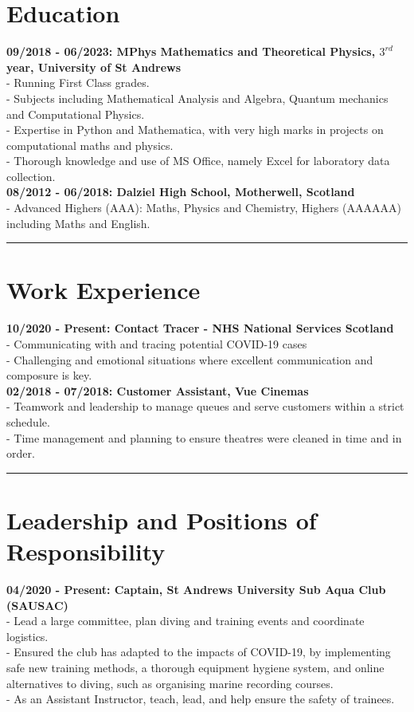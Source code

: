 %
%


%
%
\section*{Education}
\textbf{09/2018 - 06/2023: MPhys Mathematics and Theoretical Physics, $3^{rd}$ year, University of St Andrews}\\
 - Running First Class grades.\\
 - Subjects including Mathematical Analysis and Algebra, Quantum mechanics and Computational Physics.\\
 - Expertise in Python and Mathematica, with very high marks in projects on computational maths and physics.\\
 - Thorough knowledge and use of MS Office, namely Excel for laboratory data collection.\\

\textbf{08/2012 - 06/2018: Dalziel High School, Motherwell, Scotland}\\
 - Advanced Highers (AAA): Maths, Physics and Chemistry, Highers (AAAAAA) including Maths and English.

\noindent\rule[0.5ex]{\linewidth}{1pt}

%
%
\section*{Work Experience}
\textbf{10/2020 - Present: Contact Tracer - NHS National Services Scotland}\\
 - Communicating with and tracing potential COVID-19 cases\\
 - Challenging and emotional situations where excellent communication and composure is key.\\

\textbf{02/2018 - 07/2018: Customer Assistant, Vue Cinemas}\\
 - Teamwork and leadership to manage queues and serve customers within a strict schedule.\\
 - Time management and planning to ensure theatres were cleaned in time and in order.

\noindent\rule[0.5ex]{\linewidth}{1pt}

%
%
\section*{Leadership and Positions of Responsibility}
\textbf{04/2020 - Present: Captain, St Andrews University Sub Aqua Club (SAUSAC)}\\
 - Lead a large committee, plan diving and training events and coordinate logistics.\\
 - Ensured the club has adapted to the impacts of COVID-19, by implementing safe new training methods, a thorough equipment hygiene system, and online alternatives to diving, such as organising marine recording courses.\\
 - As an Assistant Instructor, teach, lead, and help ensure the safety of trainees.\\


